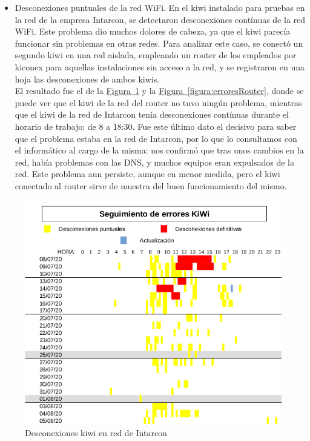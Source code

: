 \begin{itemize}
  \item Desconexiones puntuales de la red WiFi. En el kiwi instalado para pruebas en la red de la empresa Intarcon, se detectaron desconexiones contínuas de la red WiFi. Este problema dio muchos dolores de cabeza, ya que el kiwi parecía funcionar sin problemas en otras redes. Para analizar este caso, se conectó un segundo kiwi en una red aislada, empleando un router de los empleados por kiconex para aquellas instalaciones sin acceso a la red, y se registraron en una hoja las desconexiones de ambos kiwis. \\ El resultado fue el de la \hyperref[figura:erroresIntarcon]{Figura~\ref{figura:erroresIntarcon}} y la \hyperref[figura:erroresRouter]{Figura~\ref{figura:erroresRouter}}, donde se puede ver que el kiwi de la red del router no tuvo ningún problema, mientras que el kiwi de la red de Intarcon tenía desconexiones contínuas durante el horario de trabajo: de 8 a 18:30. Fue este último dato el decisivo para saber que el problema estaba en la red de Intarcon, por lo que lo consultamos con el informático al cargo de la misma: nos confirmó que tras unos cambios en la red, había problemas con las DNS, y muchos equipos eran expulsados de la red. Este problema aun persiste, aunque en menor medida, pero el kiwi conectado al router sirve de muestra del buen funcionamiento del mismo.
\end{itemize}

\clearpage
\vspace*{\fill}
\begin{figure}[H]
  \centering
  \includegraphics[width=\textwidth, keepaspectratio]{img/erroresRedIntarcon}
  \caption{Desconexiones kiwi en red de Intarcon}
  \label{figura:erroresIntarcon}
\end{figure}
\vspace*{\fill}

